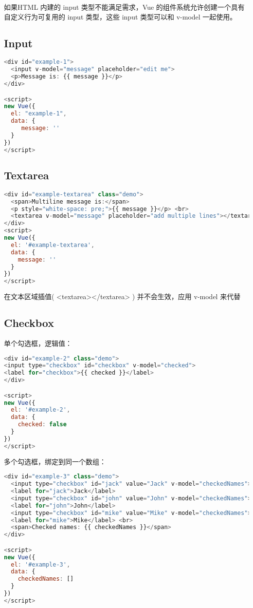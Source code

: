 如果HTML 内建的 input 类型不能满足需求，Vue 的组件系统允许创建一个具有自定义行为可复用的 input 类型，这些 input 类型可以和 v-model 一起使用。

\subsection{Input}


\begin{lstlisting}[language=JavaScript]
<div id="example-1">
  <input v-model="message" placeholder="edit me">
  <p>Message is: {{ message }}</p>
</div>

<script>
new Vue({
  el: "example-1",
  data: {
     message: ''
  }
})
</script>
\end{lstlisting}

\subsection{Textarea}


\begin{lstlisting}[language=JavaScript]
<div id="example-textarea" class="demo">
  <span>Multiline message is:</span> 
  <p style="white-space: pre;">{{ message }}</p> <br> 
  <textarea v-model="message" placeholder="add multiple lines"></textarea>
</div>
<script>
new Vue({
  el: '#example-textarea',
  data: {
    message: ''
  }
})
</script>
\end{lstlisting}

在文本区域插值( <textarea></textarea> ) 并不会生效，应用 v-model 来代替

\subsection{Checkbox}

单个勾选框，逻辑值：


\begin{lstlisting}[language=JavaScript]
<div id="example-2" class="demo">
<input type="checkbox" id="checkbox" v-model="checked"> 
<label for="checkbox">{{ checked }}</label>
</div>

<script>
new Vue({
  el: '#example-2',
  data: {
    checked: false
  }
})
</script>
\end{lstlisting}

多个勾选框，绑定到同一个数组：





\begin{lstlisting}[language=JavaScript]
<div id="example-3" class="demo">
  <input type="checkbox" id="jack" value="Jack" v-model="checkedNames"> 
  <label for="jack">Jack</label> 
  <input type="checkbox" id="john" value="John" v-model="checkedNames"> 
  <label for="john">John</label> 
  <input type="checkbox" id="mike" value="Mike" v-model="checkedNames"> 
  <label for="mike">Mike</label> <br> 
  <span>Checked names: {{ checkedNames }}</span>
</div>

<script>
new Vue({
  el: '#example-3',
  data: {
    checkedNames: []
  }
})
</script>
\end{lstlisting}

